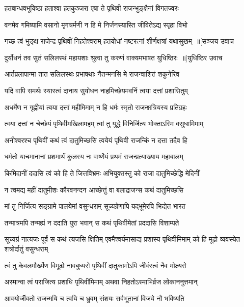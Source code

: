 \twolineshloka
{हतबान्धवभूयिष्ठा हताश्वा हतकुञ्जरा}
{एषा ते पृथिवी राजन्भुङ्क्षैनां विगतज्वरः}


\twolineshloka
{वनमेव गमिष्यामि वसानो मृगचर्मणी}
{न हि मे निर्जनस्यास्ति जीवितेऽद्य स्पृहा विभो}


\threelineshloka
{गच्छ त्वं भुङ्क्ष राजेन्द्र पृथिवीं निहतेश्वराम्}
{हतयोधां नष्टरत्नां शीर्णक्षत्रां यथासुखम् ॥[सञ्जय उवाच}
{}


\threelineshloka
{दुर्योधनं तव सुतं सलिलस्थं महायशाः}
{श्रुत्वा तु करुणं वाक्यमभाषत युधिष्ठिरः ॥]युधिष्ठिर उवाच}
{}


\twolineshloka
{आर्तप्रलापान्मा तात सलिलस्थः प्रभाषथाः}
{नैतन्मनसि मे राजन्वाशितं शकुनेरिव}


\twolineshloka
{यदि वापि समर्थः स्यास्त्वं दानाय सुयोधन}
{नाहमिच्छेयमवनिं त्वया दत्तां प्रशासितुम्}


\twolineshloka
{अधर्मेण न गृह्णीयां त्वया दत्तां महीमिमाम्}
{न हि धर्मः स्मृतो राजन्क्षत्रियस्य प्रतिग्रहः}


\twolineshloka
{त्वया दत्तां न चेच्छेयं पृथिवीमखिलामहम्}
{त्वां तु युद्धे विनिर्जित्य भोक्ताऽस्मि वसुधामिमाम्}


\twolineshloka
{अनीश्वरश्च पृथिवीं कथं त्वं दातुमिच्छसि}
{त्वयेयं पृथिवी राजन्किं न दत्ता तदैव हि}


\twolineshloka
{धर्मतो याचमानानां प्रशमार्थं कुलस्य नः}
{वार्ष्णेयं प्रथमं राजन्प्रत्याख्याय महाबालम्}


\twolineshloka
{किमिदानीं ददासि त्वं को हि ते जित्तविभ्रमः}
{अभियुक्तस्तु को राजा दातुमिच्छेद्धि मेदिनीं}


\twolineshloka
{न त्वमद्य महीं दातुमीशः कौरवनन्दन}
{आच्छेत्तुं वा बलाद्राजन्स कथं दातुमिच्छसि}


\twolineshloka
{मां तु निर्जित्य सङ्ग्रामे पालयेमां वसुन्धराम्}
{सूच्यग्रेणापि यद्भूमेरपि भिद्येत भारत}


\twolineshloka
{तन्मात्रमपि तन्मह्यं न ददाति पुरा भवान्}
{स कथं पृथिवीमेतां प्रददासि विशाम्पते}


सूच्यग्रं नात्यजः पूर्वं स कथं त्यजसि क्षितिम्
\twolineshloka
{एवमैश्वर्यमासाद्य प्रशास्य पृथिवीमिमाम्}
{को हि मूढो व्यवस्येत शत्रोर्दातुं वसुन्धराम्}


\twolineshloka
{त्वं तु केवलमौर्ख्येण विमूढो नावबुध्यसे}
{पृथिवीं दातुकामोऽपि जीवंस्त्वं नैव मोक्ष्यसे}


\twolineshloka
{अस्मान्वा त्वं पराजित्य प्रशाधि पृथिवीमिमाम्}
{अथवा निहतोऽस्माभिर्व्रज लोकाननुत्तमान्}


\twolineshloka
{आवयोर्जीवतो राजन्मयि च त्वयि च ध्रुवम्}
{संशयः सर्वभूतानां विजये नौ भविष्यति}


